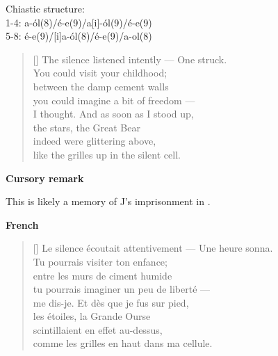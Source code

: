 \documentclass[a4paper,12pt,twoside,final]{book}
\begin{document}
\noindent Chiastic structure: \\
1-4: a-ól(8)/é-e(9)/a[i]-ól(9)/é-e(9) \\
5-8: é-e(9)/[i]a-ól(8)/é-e(9)/a-ol(8)

\newpage


\settowidth{\versewidth}{The silence listened intently --- One struck.}

\begin{verse}[\versewidth]
  The silence listened intently --- One struck. \\
  You could visit your childhood; \\
  between the damp cement walls \\
  you could imagine a bit of freedom --- \\
  I thought. And as soon as I stood up, \\
  the stars, the Great Bear \\
  indeed were glittering above, \\
  like the grilles up in the silent cell. \\
\end{verse}

\bigskip

\noindent \textbf{Cursory remark}

\medskip

This is likely a memory of J's imprisonment in .

\bigskip

\noindent \textbf{French}


\settowidth{\versewidth}{Le silence écoutait attentivement --- Une heure sonna.}

\begin{verse}[\versewidth]
  Le silence écoutait attentivement --- Une heure sonna. \\
  Tu pourrais visiter ton enfance; \\
  entre les murs de ciment humide \\
  tu pourrais imaginer un peu de liberté --- \\
  me dis-je. Et dès que je fus sur pied, \\
  les étoiles, la Grande Ourse \\
  scintillaient en effet au-dessus, \\
  comme les grilles en haut dans ma cellule. \\
\end{verse}
\end{document}
